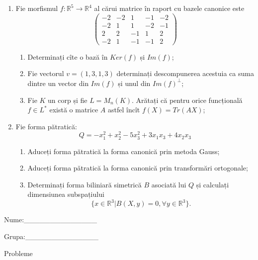 \documentclass{article}
\begin{document}
\begin{enumerate}
 \item Fie morfismul $f:\mathbb{R}^5 \to \mathbb{R}^4$ al cărui matrice în raport cu bazele canonice este
$$\begin{pmatrix}
-2&-2&1&-1&-2\\
-2&1&1&-2&-1\\
2&2&-1&1&2\\
-2&1&-1&-1&2
\end{pmatrix}$$

\begin{enumerate}
\item Determinați cîte o bază în $Ker(f)$ și $Im(f)$;
\item Fie vectorul $v=(1,3,1,3)$ determinați descompunerea acestuia ca suma dintre un vector din $Im(f)$ și unul din $Im(f)^\perp$;
\item Fie $K$ un corp și fie $L=M_n(K)$. Arătați că pentru orice funcțională $f \in L^*$ există o matrice $A$ astfel încît $f(X)=Tr(AX)$;
\end{enumerate}
\item Fie forma pătratică:
$$Q= -x_1^2+x_2^2-5x_3^2+3x_1x_3+4x_2x_3$$

\begin{enumerate}
\item Aduceți forma pătratică la forma canonică prin metoda Gauss;
\item Aduceți forma pătratică la forma canonică prin transformări ortogonale;
\item Determinați forma biliniară simetrică $B$ asociată lui $Q$ și calculați dimensiunea subspațiului
$$\{x \in \mathbb{R}^3 | B(X,y)=0,\forall y \in \mathbb{R}^3\}.$$

\end{enumerate}
\end{enumerate}
\newpage
\begin{flushright}
Nume:\_\_\_\_\_\_\_\_\_\_\_\_\_\_
 
 
Grupa:\_\_\_\_\_\_\_\_\_\_\_\_\_\_
\end{flushright}
\begin{center}
\vspace{2cm}
{\Large Probleme}
\vspace{2cm}
\end{center}
\end{document}
